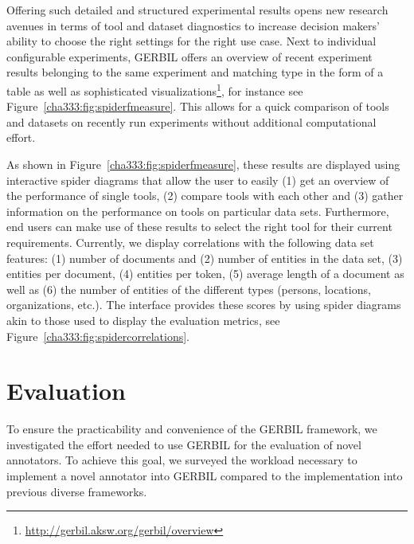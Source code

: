 Offering such detailed and structured experimental results opens new research avenues in terms of tool and dataset diagnostics to increase decision makers' ability to choose the right settings for the right use case.
Next to individual configurable experiments, GERBIL offers an overview of recent experiment results belonging to the same experiment and matching type in the form of a table as well as sophisticated visualizations\footnote{\url{http://gerbil.aksw.org/gerbil/overview}}, for instance see Figure~\ref{cha333:fig:spiderfmeasure}. 
This allows for a quick comparison of tools and datasets on recently run experiments without additional computational effort.

 As shown in Figure~\ref{cha333:fig:spiderfmeasure}, these results are displayed using interactive spider diagrams that allow the user to easily (1) get an overview of the performance of single tools, (2) compare tools with each other and (3) gather information on the performance on tools on particular data sets.
Furthermore, end users can make use of these results to select the right tool for their current requirements. Currently, we display correlations with the following data set features: (1) number of documents and (2) number of entities in the data set, (3) entities per document, (4) entities per token, (5) average length of a document as well as (6) the number  of entities of the different types (persons, locations, organizations, etc.). The interface provides these scores by using spider diagrams akin to those used to display the evaluation metrics, see Figure~\ref{cha333:fig:spidercorrelations}.





\section{Evaluation}
\label{cha332:sec:eval}

To ensure the practicability and convenience of the GERBIL framework, we investigated the effort needed to use GERBIL for the evaluation of novel annotators.
To achieve this goal, we surveyed the workload necessary to implement a novel annotator into GERBIL compared to the implementation into previous diverse frameworks.

